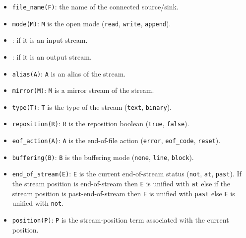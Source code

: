 \begin{itemize}

\item {}\texttt{file\_name(F)}: the name of the connected
source/sink.

\item {}\texttt{mode(M)}: \texttt{M} is the open mode (\texttt{read},
\texttt{write}, \texttt{append}).

\item {}: if it is an input stream.

\item {}: if it is an output stream.

\item {}\texttt{alias(A)}: \texttt{A} is an alias of the stream.

\item {}\texttt{mirror(M)}: \texttt{M} is a mirror stream of the
stream.

\item {}\texttt{type(T)}: \texttt{T} is the type of the stream
(\texttt{text}, \texttt{binary}).

\item {}\texttt{reposition(R)}: \texttt{R} is the reposition
boolean (\texttt{true}, \texttt{false}).

\item {}\texttt{eof\_action(A)}: \texttt{A} is the end-of-file
action (\texttt{error}, \texttt{eof\_code}, \texttt{reset}).

\item {}\texttt{buffering(B)}: \texttt{B} is the buffering mode
(\texttt{none}, \texttt{line}, \texttt{block}).

\item {}\texttt{end\_of\_stream(E)}: \texttt{E} is the
current end-of-stream status (\texttt{not}, \texttt{at}, \texttt{past}). If
the stream position is end-of-stream then \texttt{E} is unified with
\texttt{at} else if the stream position is past-end-of-stream then \texttt{E}
is unified with \texttt{past} else \texttt{E} is unified with \texttt{not}.

\item {}\texttt{position(P)}: \texttt{P} is the stream-position
term associated with the current position.

\end{itemize}

